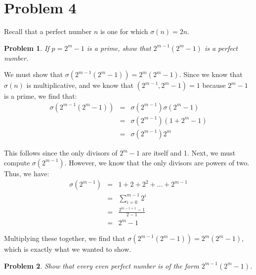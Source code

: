 \documentclass[psamsfonts]{amsart}
\newtheorem{prob}{Problem}[section]
\newenvironment{sol}{{\bfseries Solution}}{\qedsymbol}
\theoremstyle{definition}
\theoremstyle{remark}
\numberwithin{equation}{section}
\begin{document}
\section{Problem 4}

Recall that a perfect number $n$ is one for which $\sigma(n) = 2n$. 

\begin{prob}
If $p = 2^{m} - 1$ is a prime, show that $2^{m-1} (2^{m} - 1)$ is a perfect number.
\end{prob}

\begin{sol}
We must show that $\sigma(2^{m-1}(2^{m} - 1)) = 2^m (2^m - 1)$. Since we know that $\sigma(n)$ is multiplicative, and we know that $(2^{m-1}, 2^{m} - 1) = 1$ because $2^{m} - 1$ is a prime, we find that:
\begin{eqnarray}
\sigma(2^{m-1}(2^{m} - 1)) &=& \sigma(2^{m-1}) \sigma(2^{m} - 1) \\
&=& \sigma(2^{m-1}) (1 + 2^{m} - 1) \\
&=& \sigma(2^{m-1}) 2^m
\end{eqnarray}

This follows since the only divisors of $2^{m} - 1$ are itself and 1. Next, we must compute $\sigma(2^{m-1})$. However, we know that the only divisors are powers of two. Thus, we have:
\begin{eqnarray}
\sigma(2^{m-1}) &=& 1 + 2 + 2^2 + \ldots + 2^{m-1} \\
&=& \sum_{i=0}^{m-1} 2^i \\
&=& \frac{2^{m-1 + 1} - 1}{2 - 1} \\
&=& 2^{m} - 1
\end{eqnarray}

Multiplying these together, we find that $\sigma(2^{m-1} (2^{m} -  1)) = 2^m (2^{m} - 1)$, which is exactly what we wanted to show.
\end{sol}

\begin{prob}
Show that every even perfect number is of the form $2^{m-1} (2^{m} - 1)$. 
\end{prob}
\end{document}

